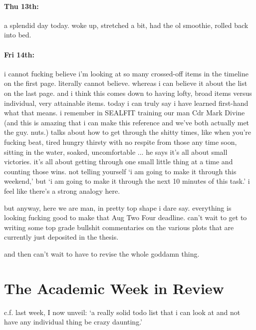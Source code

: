 \documentclass[12pt]{article}
\begin{document}
\paragraph{Thu 13th:} a splendid day today. woke up, stretched a bit, had the ol smoothie, rolled back into bed.

\paragraph{Fri 14th:} i cannot fucking believe i'm looking at so many crossed-off items in the timeline on the first page. literally cannot believe. whereas i can believe it about the list on the last page. and i think this comes down to having lofty, broad items versus individual, very attainable items. today i can truly say i have learned first-hand what that means. i remember in SEALFIT training our man Cdr Mark Divine (and this is amazing that i can make this reference and we've both actually met the guy. nuts.) talks about how to get through the shitty times, like when you're fucking beat, tired hungry thirsty with no respite from those any time soon, sitting in the water, soaked, uncomfortable ... he says it's all about small victories. it's all about getting through one small little thing at a time and counting those wins. not telling yourself `i am going to make it through this weekend,' but `i am going to make it through the next 10 minutes of this task.' i feel like there's a strong analogy here. \par 
but anyway, here we are man, in pretty top shape i dare say. everything is looking fucking good to make that Aug Two Four deadline. can't wait to get to writing some top grade bullshit commentaries on the various plots that are currently just deposited in the thesis. \par 
and then can't wait to have to revise the whole goddamn thing.

\section*{The Academic Week in Review}
c.f. last week, I now unveil: `a really solid todo list that i can look at and not have any individual thing be crazy daunting.'

\clearpage 
\end{document}
